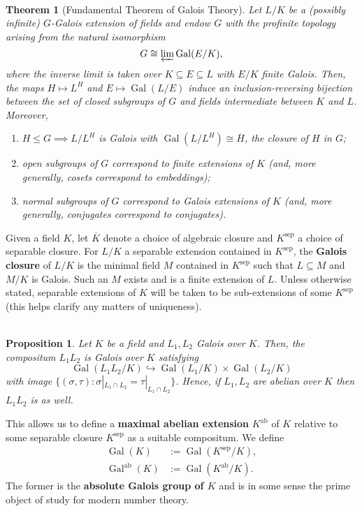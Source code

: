 \documentclass[11pt]{article}
\newcommand{\inj}{\hookrightarrow}
\newcommand{\iso}{\cong}
\newcommand{\ov}[1]{\overline{#1}}
\DeclareMathOperator{\ab}{ab} %
\DeclareMathOperator{\Gal}{Gal}
\DeclareMathOperator{\sep}{sep} %
\renewcommand{\subset}{\subseteq}
\newcommand{\flim}{\varprojlim}
\newenvironment{enum}[1]{
\begin{enumerate}[label=\textup{({#1*})}]
}
{
\end{enumerate}
}
\newtheorem*{proposition*}{\\Proposition}
\newtheorem*{theorem*}{\\Theorem}
\begin{document}
\begin{theorem*}[Fundamental Theorem of Galois Theory]
Let $L/K$ be a (possibly infinite) $G$-Galois extension of fields and endow $G$ with the profinite topology arising from the natural isomorphism
$$G\iso\flim\Gal(E/K),$$
where the inverse limit is taken over $K\subset E\subset L$ with $E/K$ finite Galois. Then, the maps $H\mapsto L^H$ and $E\mapsto\Gal(L/E)$ induce an inclusion-reversing bijection between the set of closed subgroups of $G$ and fields intermediate between $K$ and $L$. Moreover,
\begin{enum}{\roman}
\item $H\leq G\implies L/L^H$ is Galois with $\Gal(L/L^H)\iso\ov{H}$, the closure of $H$ in $G$;
\item open subgroups of $G$ correspond to finite extensions of $K$ (and, more generally, cosets correspond to embeddings);
\item normal subgroups of $G$ correspond to Galois extensions of $K$ (and, more generally, conjugates correspond to conjugates).
\end{enum}
\end{theorem*}

Given a field $K$, let $\ov{K}$ denote a choice of algebraic closure and $K^{\sep}$ a choice of separable closure. For $L/K$ a separable extension contained in $K^{\sep}$, the \textbf{Galois closure} of $L/K$ is the minimal field $M$ contained in $K^{\sep}$ such that $L\subset M$ and $M/K$ is Galois. Such an $M$ exists and is a finite extension of $L$. Unless otherwise stated, separable extensions of $K$ will be taken to be sub-extensions of some $K^{\sep}$ (this helps clarify any matters of uniqueness).

\begin{proposition*}
Let $K$ be a field and $L_1,L_2$ Galois over $K$. Then, the compositum $L_1L_2$ is Galois over $K$ satisfying 
$$\Gal(L_1L_2/K)\inj\Gal(L_1/K)\times\Gal(L_2/K)$$
with image $\{(\sigma,\tau) : \sigma|_{L_1\cap L_2}=\tau|_{L_1\cap L_2}\}$. Hence, if $L_1,L_2$ are abelian over $K$ then $L_1L_2$ is as well.
\end{proposition*}

This allows us to define a \textbf{maximal abelian extension} $K^{\ab}$ of $K$ relative to some separable closure $K^{\sep}$ as a suitable compositum. We define 
\begin{align*}
\Gal(K)&:=\Gal(K^{\sep}/K), \\
\Gal^{\ab}(K)&:=\Gal(K^{\ab}/K).
\end{align*}
The former is the \textbf{absolute Galois group of $K$} and is in some sense the prime object of study for modern number theory.
\end{document}
